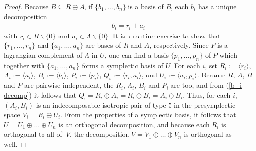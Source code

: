 \documentclass[pdftex]{sigma}
\numberwithin{equation}{section}
\begin{document}
\begin{proof}
Because $B \subseteq R \oplus A$, if $\{b_1,\dots  ,b_n \}$ is a basis of $B$, each $b_i$ has a unique decomposition
\begin{gather}\label{b_i decomp}
b_i = r_i + a_i
\end{gather}
with  $r_i \in R \backslash \{0\}$ and $a_i \in A \backslash \{0\}$. It is a routine exercise to show that $\{r_1,\dots  ,r_n \}$ and $\{a_1,\dots  ,a_n \}$ are bases of $R$ and $A$, respectively.
Since $P$ is a lagrangian complement of $A$ in $U$, one can f\/ind a basis $\{p_1,\dots  ,p_n \}$ of $P$ which together with $\{a_1,\dots  ,a_n \}$ forms a symplectic basis of $U$.
For each $i$, set $R_i := \langle r_i \rangle$, $A_i := \langle a_i \rangle$, $B_i := \langle b_i \rangle$, $P_i := \langle p_i \rangle$, $Q_i := \langle r_i, a_i \rangle$, and $U_i := \langle a_i,p_i \rangle$.  Because $R$, $A$, $B$ and $P$ are pairwise independent, the $R_i$, $A_i$, $B_i$ and $P_i$ are too, and from (\ref{b_i decomp}) it follows that $Q_i = R_i \oplus A_i = R_i \oplus B_i = A_i \oplus B_i$. Thus, for each $i$, $(A_i,B_i)$ is an indecomposable isotropic pair of type $5$ in the presymplectic space $V_i = R_i \oplus U_i$.   From the properties of a symplectic basis, it follows that $U = U_1 \oplus \dots  \oplus U_n$ is an orthogonal decomposition, and because each $R_i$ is orthogonal to all of~$V$, the decomposition $V = V_1 \oplus \dots  \oplus V_n$ is orthogonal as well.



\end{proof}
\end{document}
